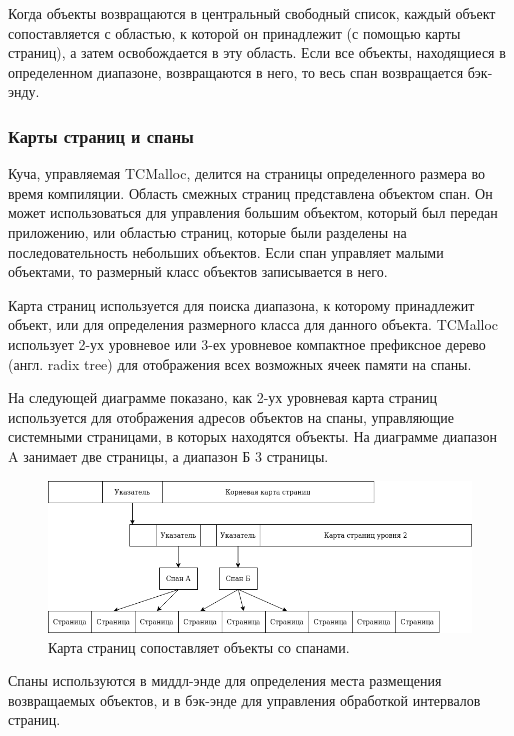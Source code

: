 Когда объекты возвращаются в центральный свободный список, каждый объект сопоставляется с областью, к которой он принадлежит (с помощью карты страниц), а затем освобождается в эту область. Если все объекты, находящиеся в определенном диапазоне, возвращаются в него, то весь спан возвращается бэк-энду.

\subsubsection{Карты страниц и спаны}

Куча, управляемая TCMalloc, делится на страницы определенного размера во время компиляции. Область смежных страниц представлена объектом спан. Он может использоваться для управления большим объектом, который был передан приложению, или областью страниц, которые были разделены на последовательность небольших объектов. Если спан управляет малыми объектами, то размерный класс объектов записывается в него.

Карта страниц используется для поиска диапазона, к которому принадлежит объект, или для определения размерного класса для данного объекта. TCMalloc использует 2-ух уровневое или 3-ех уровневое компактное префиксное дерево (англ. radix tree) для отображения всех возможных ячеек памяти на спаны.

На следующей диаграмме показано, как 2-ух уровневая карта страниц используется для отображения адресов объектов на спаны, управляющие системными страницами, в которых находятся объекты. На диаграмме диапазон A занимает две страницы, а диапазон Б 3 страницы.

\begin{figure}[!h]
	\begin{center}
		\includegraphics[scale=0.6]{images/tcmalloc-pagemap-and-spans.png}
		\caption{Карта страниц сопоставляет объекты со спанами.}
		\label{tcmalloc-pagemap-and-spans}
	\end{center}
\end{figure}

Спаны используются в миддл-энде для определения места размещения возвращаемых объектов, и в бэк-энде для управления обработкой интервалов страниц.

